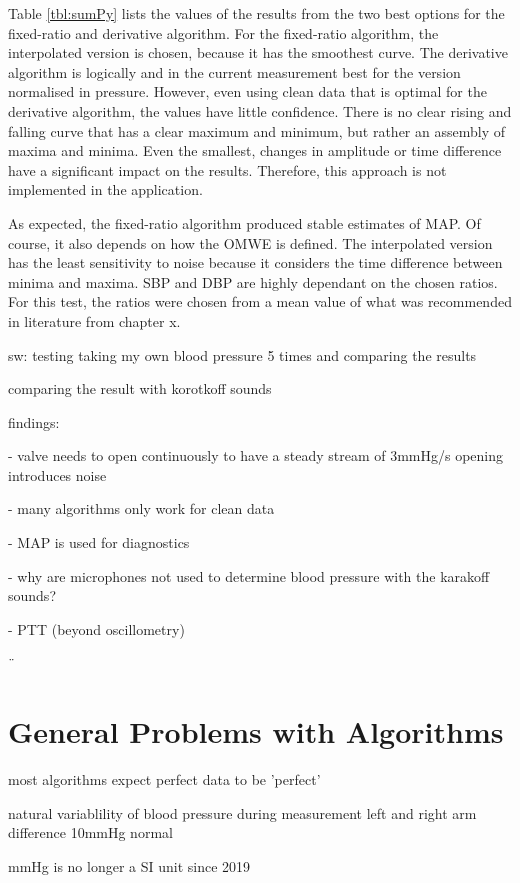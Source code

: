 Table \ref{tbl:sumPy} lists the values of the results from the two best options for the fixed-ratio and derivative algorithm. For the fixed-ratio algorithm, the interpolated version is chosen, because it has the smoothest curve. The derivative algorithm is logically and in the current measurement best for the version normalised in pressure. However, even using clean data that is optimal for the derivative algorithm, the values have little confidence. There is no clear rising and falling curve that has a clear maximum and minimum, but rather an assembly of maxima and minima. Even the smallest, changes in amplitude or time difference have a significant impact on the results. Therefore, this approach is not implemented in the application.

As expected, the fixed-ratio algorithm produced stable estimates of MAP. Of course, it also depends on how the OMWE is defined. The interpolated version has the least sensitivity to noise because it considers the time difference between minima and maxima. SBP and DBP are highly dependant on the chosen ratios. For this test, the ratios were chosen from a mean value of what was recommended in literature from chapter x.



sw:
testing taking my own blood pressure 5 times and comparing the results

comparing the result with korotkoff sounds 


findings:




- valve needs to open continuously to have a steady stream of 3mmHg/s
  opening introduces noise

- many algorithms only work for clean data

- MAP is used for diagnostics

- why are microphones not used to determine blood pressure with the karakoff sounds?

- PTT (beyond oscillometry)

¨
\
\section{General Problems with Algorithms}
most algorithms expect perfect data to be 'perfect'

natural variablility of blood pressure during measurement
left and right arm difference 10mmHg normal


mmHg is no longer a SI unit since 2019
